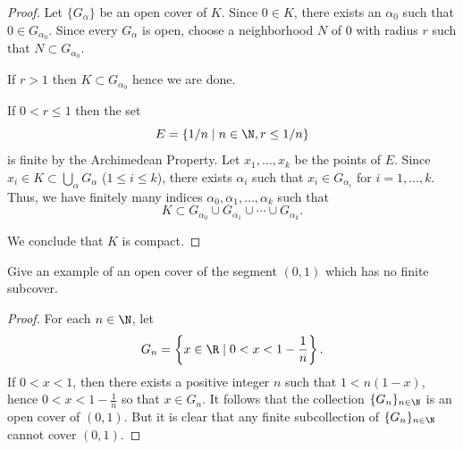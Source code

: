 \begin{proof}
Let $\{G_{\alpha}\}$ be an open cover of $K$.
Since $0 \in K$, there exists an $\alpha_0$ such that $0 \in G_{\alpha_0}$.
Since every $G_\alpha$ is open, choose a neighborhood $N$ of $0$ with radius $r$ such that $N \subset G_{\alpha_0}$.

If $r>1$ then $K \subset G_{\alpha_0}$ hence we are done. 

If $0 < r \leq 1$ then the set 
\begin{equation*}
E=\left\{1/n \mid n \in \N, r \leq 1/n \right\}
\end{equation*}
is finite by the Archimedean Property.
Let $x_1, \ldots, x_k$ be the points of $E$.
Since $x_i \in K \subset \bigcup_{\alpha} G_{\alpha}$ ($1 \leq i \leq k$), there exists $\alpha_i$ such that $x_i \in G_{\alpha_i}$ for $i=1, \ldots, k$.
Thus, we have finitely many indices $\alpha_0, \alpha_1, \ldots, \alpha_k$ such that
\[
K \subset G_{\alpha_0} \cup G_{\alpha_1} \cup \cdots \cup G_{\alpha_k}.
\]

We conclude that $K$ is compact.
\end{proof}

\begin{exercise}
Give an example of an open cover of the segment $(0,1)$ which has no finite subcover.
\end{exercise}
\begin{proof}
For each $n \in \N$, let
\[
G_n=\left\{x \in \R \mid 0<x<1-\frac{1}{n}\right\}.
\]
If $0<x<1$, then there exists a positive integer $n$ such that $1<n(1-x)$, hence $0<x<1-\frac{1}{n}$ so that $x \in G_n$.
It follows that the collection $\{G_n\}_{n \in \N}$ is an open cover of $(0,1)$.
But it is clear that any finite subcollection of $\{G_n\}_{n \in \N}$ cannot cover $(0,1)$.
\end{proof}
